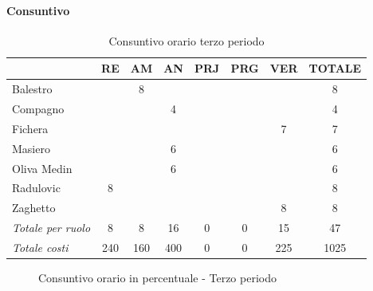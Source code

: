 \documentclass[a4paper,12pt]{article}
\begin{document}
            \paragraph{Consuntivo}
                \begin{table}[H]
                \centering
                \begin{tabular}{|l|c|c|c|c|c|c|c|}
                \hline
                    \rowcolor{lightgray}{\textbf{Membro}} & {\textbf{RE}} & {\textbf{AM}} & {\textbf{AN}} & {\textbf{PRJ}} & {\textbf{PRG}} & {\textbf{VER}} & {\textbf{TOTALE}}\\
                \hline
                    Balestro & & 8 & & & & & 8\\
                \hline
                    Compagno & & & 4 & & & & 4\\
                \hline
                    Fichera & & & & & & 7 & 7\\
                \hline
                    Masiero & & & 6 & & & & 6\\
                \hline
                    Oliva Medin & & & 6 & & & & 6\\
                \hline
                    Radulovic & 8 & & & & & & 8\\
                \hline
                    Zaghetto & & & & & & 8 & 8\\
                \hline
                    \rowcolor{lightgray}\textit{Totale per ruolo} & 8 & 8 & 16 & 0 & 0 & 15 & 47\\
                \hline
                    \rowcolor{lightgray}\textit{Totale costi} & 240 & 160 & 400 & 0 & 0 & 225 & 1025\\
                \hline
                \end{tabular}
                \caption{Consuntivo orario terzo periodo}
                \end{table}

                \begin{figure}[H]
                \centering
                \caption{Consuntivo orario in percentuale - Terzo periodo}
                \end{figure}
                
\end{document}

